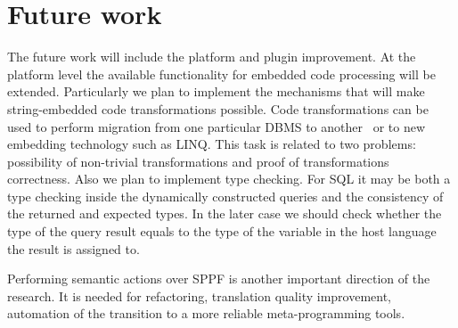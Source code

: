 \documentclass{sig-alternate-05-2015}
\begin{document}
\newpage
\section{Future work}

The future work will include the platform and plugin improvement. At the platform level the available functionality for embedded code processing will be extended. Particularly we plan to implement the mechanisms that will make string-embedded code transformations possible. Code transformations can be used to perform migration from one particular DBMS to another~\cite{Migration:ref} or to new embedding technology such as LINQ. This task is related to two problems: possibility of non-trivial transformations and proof of transformations correctness. Also we plan to implement type checking. For SQL it may be both a type checking inside the dynamically constructed queries and the consistency of the returned and expected types. In the later case we should check whether the type of the query result equals to the type of the variable in the host language the result is assigned to.

Performing semantic actions over SPPF is another important direction of the research. It is needed for refactoring, translation quality improvement, automation of the transition to a more reliable meta-programming tools.




\balancecolumns

\end{document}
